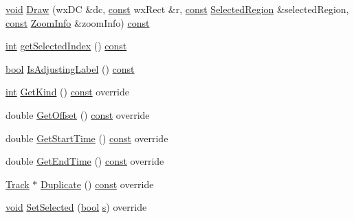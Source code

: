 \begin{DoxyCompactItemize}
\item 
\hyperlink{sound_8c_ae35f5844602719cf66324f4de2a658b3}{void} \hyperlink{class_label_track_a8ea914e523a578a392a99373bc803797}{Draw} (wx\+DC \&dc, \hyperlink{getopt1_8c_a2c212835823e3c54a8ab6d95c652660e}{const} wx\+Rect \&r, \hyperlink{getopt1_8c_a2c212835823e3c54a8ab6d95c652660e}{const} \hyperlink{class_selected_region}{Selected\+Region} \&selected\+Region, \hyperlink{getopt1_8c_a2c212835823e3c54a8ab6d95c652660e}{const} \hyperlink{class_zoom_info}{Zoom\+Info} \&zoom\+Info) \hyperlink{getopt1_8c_a2c212835823e3c54a8ab6d95c652660e}{const} 
\item 
\hyperlink{xmltok_8h_a5a0d4a5641ce434f1d23533f2b2e6653}{int} \hyperlink{class_label_track_aec043819f723185729fc087c7f8b128c}{get\+Selected\+Index} () \hyperlink{getopt1_8c_a2c212835823e3c54a8ab6d95c652660e}{const} 
\item 
\hyperlink{mac_2config_2i386_2lib-src_2libsoxr_2soxr-config_8h_abb452686968e48b67397da5f97445f5b}{bool} \hyperlink{class_label_track_ae2d5ab75f2933783cdf69107d60c71b0}{Is\+Adjusting\+Label} () \hyperlink{getopt1_8c_a2c212835823e3c54a8ab6d95c652660e}{const} 
\item 
\hyperlink{xmltok_8h_a5a0d4a5641ce434f1d23533f2b2e6653}{int} \hyperlink{class_label_track_a27185054024ca86b0fd79d6257db1822}{Get\+Kind} () \hyperlink{getopt1_8c_a2c212835823e3c54a8ab6d95c652660e}{const}  override
\item 
double \hyperlink{class_label_track_a644b9b92976e1a9130033d702442f343}{Get\+Offset} () \hyperlink{getopt1_8c_a2c212835823e3c54a8ab6d95c652660e}{const}  override
\item 
double \hyperlink{class_label_track_ab74baa087935344c5e5886da06631bc6}{Get\+Start\+Time} () \hyperlink{getopt1_8c_a2c212835823e3c54a8ab6d95c652660e}{const}  override
\item 
double \hyperlink{class_label_track_a00581204bb86be2ca7c980f3ced9a102}{Get\+End\+Time} () \hyperlink{getopt1_8c_a2c212835823e3c54a8ab6d95c652660e}{const}  override
\item 
\hyperlink{class_track}{Track} $\ast$ \hyperlink{class_label_track_ae729b5cff3bdc433b0db9a4bfb8af288}{Duplicate} () \hyperlink{getopt1_8c_a2c212835823e3c54a8ab6d95c652660e}{const}  override
\item 
\hyperlink{sound_8c_ae35f5844602719cf66324f4de2a658b3}{void} \hyperlink{class_label_track_a76e4fd0bb85109b8e82a65e12e579cc2}{Set\+Selected} (\hyperlink{mac_2config_2i386_2lib-src_2libsoxr_2soxr-config_8h_abb452686968e48b67397da5f97445f5b}{bool} \hyperlink{lib_2expat_8h_a755339d27872b13735c2cab829e47157}{s}) override

\end{DoxyCompactItemize}
